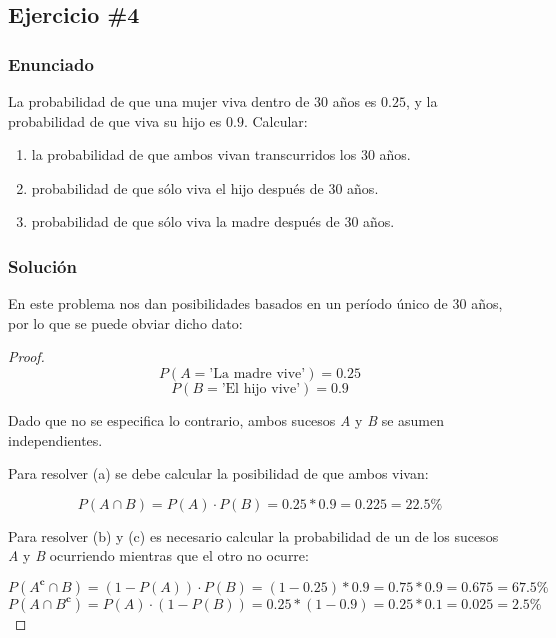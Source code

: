 \documentclass[12pt,a4paper]{article}
\begin{document}
\subsection{Ejercicio \#4}

\subsubsection{Enunciado}

La probabilidad de que una mujer viva dentro de \(30\) años es \(0.25\), y la probabilidad de que viva su hijo es \(0.9\). Calcular:
\begin{enumerate}
  \item[a)] la probabilidad de que ambos vivan transcurridos los 30 años.
  \item[b)] probabilidad de que sólo viva el hijo después de 30 años.
  \item[c)] probabilidad de que sólo viva la madre después de 30 años.
\end{enumerate}

\subsubsection{Solución}

En este problema nos dan posibilidades basados en un período único de \(30\) años, por lo que se puede obviar dicho dato:

\begin{proof}

  \begin{equation*}
    P(A = \text{'La madre vive'})=0.25
  \end{equation*}
  \begin{equation*}
    P(B = \text{'El hijo vive'})=0.9
  \end{equation*}

  Dado que no se especifica lo contrario, ambos sucesos \textit{A} y \textit{B} se asumen independientes.

  Para resolver (a) se debe calcular la posibilidad de que ambos vivan:

  \begin{equation*}
    P(A\cap B)=P(A)\cdot P(B)=0.25*0.9=0.225=22.5\%
  \end{equation*}

  Para resolver (b) y (c) es necesario calcular la probabilidad de un de los sucesos \textit{A} y \textit{B} ocurriendo mientras que el otro no ocurre:

  \begin{equation*}
    P(A^{\textbf{c}}\cap B)=(1-P(A))\cdot P(B)=(1-0.25)*0.9=0.75*0.9=0.675=67.5\%
  \end{equation*}
  \begin{equation*}
    P(A\cap B^{\textbf{c}})=P(A)\cdot (1-P(B))=0.25*(1-0.9)=0.25*0.1=0.025=2.5\%
  \end{equation*}
\end{proof}
\end{document}
